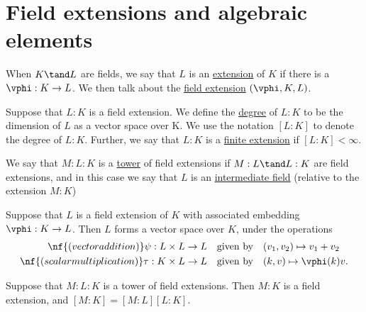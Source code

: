 \documentclass{article}
\begin{document}
\section{Field extensions and algebraic elements}
  \begin{tdefinition}
    When \( K \tand L \) are fields, we say that \( L \) is an \ul{extension} of \( K \) if there is a \homo~\( \vphi: K \to L \).
    We then talk about the \ul{field extension}
  \( (\vphi,K,L) \).
  \end{tdefinition}

  \begin{tdefinition}
    Suppose that \( L: K \) is a field extension.
    We define the \ul{degree} of \( L: K \) to be the dimension of \( L \) as a vector space over K.
    We use the notation \( [L : K] \) to denote the degree of \( L : K \).
    Further, we say that \( L : K \) is a \ul{finite extension} if \( [L: K] <\infty \).
  \end{tdefinition}

  \begin{tdefinition}
    We say that \( M : L : K \) is a \ul{tower} of field extensions if \( M : L \tand L: K \) are field extensions, and in this case we say that \( L \) is an \ul{intermediate field} (relative to the extension \( M : K \))
  \end{tdefinition}

  \begin{tproposition}
    Suppose that \( L \) is a field extension of \( K \) with associated embedding \( \vphi: K \to L \).
    Then \( L \) forms a vector space over \( K \), under the operations \begin{align*}
      \nf{(vector addition) } \psi: L\times L &\to L \quad \text{given by} \quad (v_1,v_2) \mapsto v_1 + v_2 \\
      \nf{(scalar multiplication) } \tau : K\times  L &\to L \quad \text{given by} \quad (k,v) \mapsto \vphi(k)v.
    \end{align*}
  \end{tproposition}

  \begin{ttheorem}
    Suppose that \( M :L: K \) is a tower of field extensions.
    Then \( M : K \) is a field extension, and \( [M : K] = [M : L][L: K] \).
  \end{ttheorem}
\end{document}
